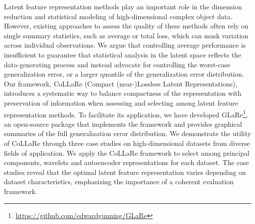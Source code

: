

Latent feature representation methods play an important role in the dimension reduction and statistical modeling of high-dimensional complex object data.
However, existing approaches to assess the quality of these methods often rely on single summary statistics, such as average or total loss, which can mask variation across individual observations.
We argue that controlling average performance is insufficient to guarantee that statistical analysis in the latent space reflects the data-generating process and instead advocate for controlling the worst-case generalization error, or a larger quantile of the generalization error distribution.
Our framework, CoLLaRe (Compact (near-)Lossless Latent Representations), introduces a systematic way to balance compactness of the representation with preservation of information when assessing and selecting among latent feature representation methods. 
To facilitate its application, we have developed GLaRe\footnote{\url{https://github.com/edwardgunning/GLaRe}}, an open-source  package that implements the framework and provides graphical summaries of the full generalization error distribution.
We demonstrate the utility of CoLLaRe through three case studies on high-dimensional datasets from diverse fields of application.
We apply the CoLLaRe framework to select among principal components, wavelets and autoencoder representations for each dataset.
The case studies reveal that the optimal latent feature representation varies depending on dataset characteristics, emphasizing the importance of a coherent evaluation framework.


